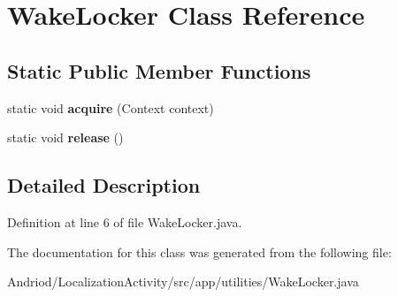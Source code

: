 \hypertarget{classapp_1_1utilities_1_1_wake_locker}{\section{Wake\-Locker Class Reference}
\label{classapp_1_1utilities_1_1_wake_locker}
}
\subsection*{Static Public Member Functions}
\begin{DoxyCompactItemize}
\item 
\hypertarget{classapp_1_1utilities_1_1_wake_locker_a6f9a6a94f7774f14b7c517688456c779}{static void {\bfseries acquire} (Context context)}\label{classapp_1_1utilities_1_1_wake_locker_a6f9a6a94f7774f14b7c517688456c779}

\item 
\hypertarget{classapp_1_1utilities_1_1_wake_locker_a9e5d3fad9e601bb8c8c37183aaa737d2}{static void {\bfseries release} ()}\label{classapp_1_1utilities_1_1_wake_locker_a9e5d3fad9e601bb8c8c37183aaa737d2}

\end{DoxyCompactItemize}


\subsection{Detailed Description}


Definition at line 6 of file Wake\-Locker.\-java.



The documentation for this class was generated from the following file\-:\begin{DoxyCompactItemize}
\item 
Andriod/\-Localization\-Activity/src/app/utilities/Wake\-Locker.\-java\end{DoxyCompactItemize}
